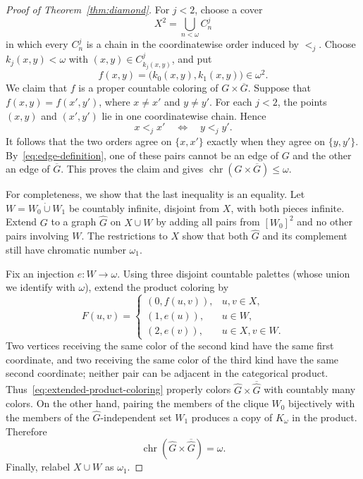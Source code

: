 \documentclass{amsart}
\numberwithin{equation}{section}
\theoremstyle{definition}
\theoremstyle{remark}
\newcommand{\chr}{\operatorname{chr}}
\begin{document}
\begin{proof}[Proof of Theorem~\ref{thm:diamond}]
For $j<2$, choose a cover
\begin{displaymath}
 X^2=\bigcup_{n<\omega}C_n^j
\end{displaymath}
in which every $C_n^j$ is a chain in the coordinatewise order induced
by $<_{j}$.  Choose $k_j(x,y)<\omega$ with
$(x,y)\in C_{k_j(x,y)}^j$, and put
\begin{displaymath}
 f(x,y)=\bigl(k_0(x,y),k_1(x,y)\bigr)\in\omega^2.
\end{displaymath}
We claim that $f$ is a proper countable coloring of
$G\times\overline G$.  Suppose that
$f(x,y)=f(x',y')$, where $x\ne x'$ and $y\ne y'$.  For each
$j<2$, the points $(x,y)$ and $(x',y')$ lie in one coordinatewise
chain.  Hence
\begin{displaymath}
 x<_{j}x'\quad\Longleftrightarrow\quad y<_{j}y'.
\end{displaymath}
It follows that the two orders agree on $\{x,x'\}$ exactly when they agree on
$\{y,y'\}$.  By~\eqref{eq:edge-definition}, one of these pairs cannot
be an edge of $G$ and the other an edge of $\overline G$.  This proves
the claim and gives
$\chr(G\times\overline G)\leq\omega$.

For completeness, we show that the last inequality is an equality.
Let $W=W_0\mathbin{\dot\cup}W_1$ be countably infinite, disjoint from
$X$, with both pieces infinite.  Extend $G$ to a graph $\widehat G$ on
$X\cup W$ by adding all pairs from $[W_0]^2$ and no other pairs
involving $W$.  The restrictions to $X$ show that both $\widehat G$
and its complement still have chromatic number $\omega_1$.

Fix an injection $e:W\to\omega$.  Using three disjoint countable
palettes (whose union we identify with $\omega$), extend the product
coloring by
\begin{equation}\label{eq:extended-product-coloring}
 F(u,v)=
 \begin{cases}
  (0,f(u,v)),&u,v\in X,\\
  (1,e(u)),&u\in W,\\
  (2,e(v)),&u\in X, v\in W.
 \end{cases}
\end{equation}
Two vertices receiving the same color of the second kind have the
same first coordinate, and two receiving the same color of the third
kind have the same second coordinate; neither pair can be adjacent in
the categorical product.  Thus~\eqref{eq:extended-product-coloring}
properly colors
$\widehat G\times\overline{\widehat G}$ with countably many colors.
On the other hand, pairing the members of the clique $W_0$ bijectively
with the members of the $\widehat G$-independent set $W_1$ produces a
copy of $K_\omega$ in the product.  Therefore
\begin{displaymath}
 \chr(\widehat G\times\overline{\widehat G})=\omega.
\end{displaymath}
Finally, relabel $X\cup W$ as $\omega_1$.
\end{proof}
\end{document}
